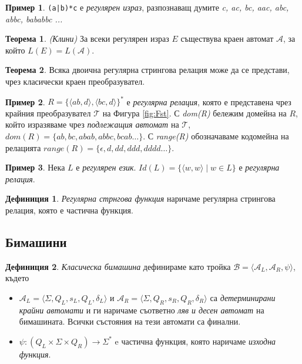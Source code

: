 \documentclass[12pt, oneside]{article}
\theoremstyle{definition}
\newtheorem{definition}{Дефиниция}[section]
\newtheorem{theorem}{Теорема}[section]
\newtheorem{example}{Пример}[section]
\begin{document}
\begin{example}
	\verb/(a|b)*c/ е \emph{регулярен израз}, разпознаващ думите \emph{c, ac, bc, aac, abc, abbc, bababbc ...}
\end{example}

\begin{theorem}{\emph{(Клини)}}
	За всеки регулярен израз \( E \) съществува краен автомат \( \mathcal{A} \), за който \( L(E) = L(\mathcal{A})\).
\end{theorem}

\begin{theorem}
	Всяка двоична регулярна стрингова релация може да се представи, чрез класически краен преобразувател.
\end{theorem}

\begin{example}
	\( R = \{ \langle ab, d \rangle, \langle bc, d \rangle \}^* \) е \emph{регулярна релация}, която е представена чрез крайния преобразувател \(\mathcal{T}\) на Фигура \ref{fig:Fst}. С \emph{dom(R)} бележим домейна на \(R\), който изразяваме чрез \emph{подлежащия автомат} на \( \mathcal{T} \), \( dom(R) =  \{ ab, bc, abab, abbc, bcab \dots \} \). С \emph{range(R)} обозначаваме кодомейна на релацията \( range(R) =  \{ \epsilon, d, dd, ddd, dddd \dots \} \).
\end{example}

\begin{example}
	Нека \(L\) е \emph{регулярен език}. \( Id(L) = \{ \langle w, w \rangle \mid w \in L \}\) е \emph{регулярна релация}.
\end{example}

\begin{definition}
	\emph{Регулярна стрнгова функция} наричаме регулярна стрингова релация, която е частична функция. 
\end{definition}

\subsection{Бимашини}

\begin{definition}
	 \emph{Класическа бимашина} дефинираме като тройка \( \mathcal{B} = \langle \mathcal{A}_L, \mathcal{A}_R, \psi \rangle \), където

	\begin{itemize}
		\item \( \mathcal{A}_L = \langle \Sigma, Q_L, s_L, Q_L, \delta_L \rangle \) и \( \mathcal{A}_R = \langle \Sigma, Q_R, s_R, Q_R, \delta_R \rangle \) са \emph{детерминирани крайни автомати} и ги наричаме съответно \emph{ляв и десен автомат} на бимашината. Всички състояния на тези автомати са финални.
		\item \( \psi:(Q_L \times \Sigma \times Q_R) \to \Sigma^* \) e частична функция, която наричаме \emph{изходна функция}.
	\end{itemize}
\end{definition}
\end{document}
